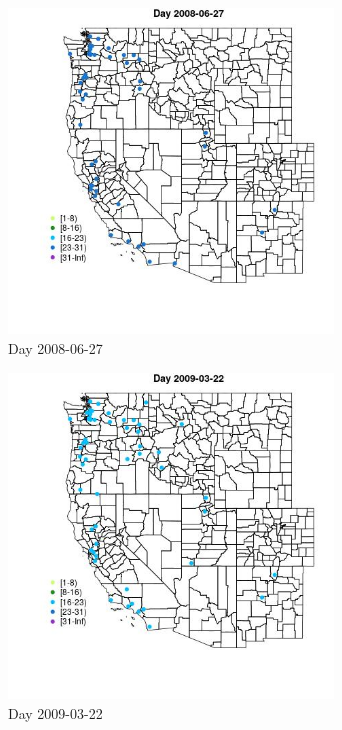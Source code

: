 \begin{figure} 
\centering  
\includegraphics[width=0.77\textwidth]{Code_Outputs/Report_ML_input_PM25_Step4_part_e_de_duplicated_aves_MapObsDay2008-06-27.jpg} 
\caption{\label{fig:Report_ML_input_PM25_Step4_part_e_de_duplicated_avesMapObsDay2008-06-27}Day 2008-06-27} 
\end{figure} 
 

\begin{figure} 
\centering  
\includegraphics[width=0.77\textwidth]{Code_Outputs/Report_ML_input_PM25_Step4_part_e_de_duplicated_aves_MapObsDay2009-03-22.jpg} 
\caption{\label{fig:Report_ML_input_PM25_Step4_part_e_de_duplicated_avesMapObsDay2009-03-22}Day 2009-03-22} 
\end{figure} 
 

